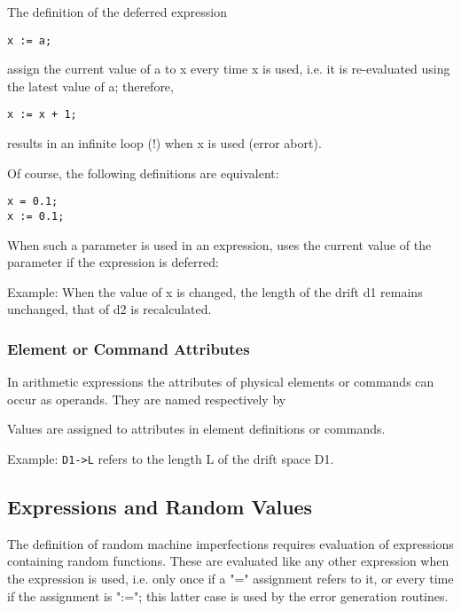 The definition of the deferred expression  
\begin{verbatim}
x := a;
\end{verbatim} 
assign the current value of a to x every time x is used, i.e. it is
re-evaluated using the latest value of a; therefore,  
\begin{verbatim}
x := x + 1;
\end{verbatim} 
results in an infinite loop (!) when x is used (error abort). 

Of course, the following definitions are equivalent:  
\begin{verbatim}
x = 0.1;
x := 0.1;
\end{verbatim}

When such a parameter is used in an expression, \madx uses the current
value of the parameter if the expression is deferred:  

Example: 
When the value of x is changed, the length of the drift d1 remains
unchanged, that of d2 is recalculated.   

\subsubsection{Element or Command Attributes} 
In arithmetic expressions the attributes of physical elements or
commands can occur as operands. They are named respectively by  

Values are assigned to attributes in element definitions or commands. 

Example: 
\texttt{D1-\textgreater L} refers to the length L of the drift space D1.  

\subsection{Expressions and Random Values}
\label{subsec:expr_rnd}
The definition of random machine imperfections requires evaluation of
expressions containing random functions. These are evaluated like any
other expression when the expression is used, i.e. only once if a "="
assignment refers to it, or every time if the assignment is ":="; this
latter case is used by the error generation routines.  

